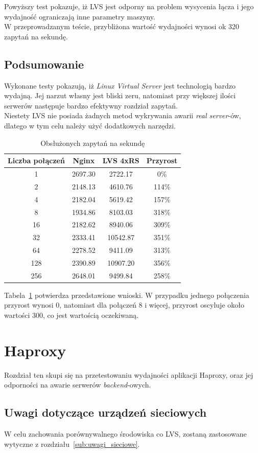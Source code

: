 Powyższy test pokazuje, iż LVS jest odporny na problem wysycenia łącza i jego wydajność ograniczają inne parametry maszyny.\\
W przeprowadzanym teście, przybliżona wartość wydajności wynosi ok 320 zapytań na sekundę.
\subsection{Podsumowanie}
Wykonane testy pokazują, iż \textit{Linux Virtual Server} jest technologią bardzo wydajną.
Jej narzut własny jest bliski zeru, natomiast przy większej ilości serwerów następuje bardzo efektywny rozdział zapytań.\\
Niestety LVS nie posiada żadnych metod wykrywania awarii \textit{real server}-ów, dlatego w tym celu należy użyć dodatkowych narzędzi.
\begin{table}[h]
\centering
\begin{tabular}{cccc}
	\toprule
	Liczba połączeń & Nginx & LVS 4xRS & Przyrost\\
	\midrule
	\midrule
	1&2697.30&2722.17&0\%\\
	\midrule
	2&2148.13&4610.76&114\%\\
	\midrule
	4&2182.04&5619.42&157\%\\
	\midrule
	8&1934.86&8103.03&318\%\\
	\midrule
	16&2182.62&8940.06&309\%\\
	\midrule
	32&2333.41&10542.87&351\%\\
	\midrule
	64&2278.52&9411.09&313\%\\
	\midrule
	128&2390.89&10907.20&356\%\\
	\midrule
	256&2648.01&9499.84&258\%\\
	\bottomrule
\end{tabular}
\caption{Obsłużonych zapytań na sekundę}
\label{tab:test_lvs}
\end{table}
Tabela~\ref{tab:test_lvs} potwierdza przedstawione wnioski.
W przypadku jednego połączenia przyrost wynosi 0, natomiast dla połączeń 8 i więcej, przyrost oscyluje około wartości 300, co jest wartością oczekiwaną.
\section{Haproxy}
Rozdział ten skupi się na przetestowaniu wydajności aplikacji Haproxy, oraz jej odporności na awarie serwerów \textit{backend}-owych.
\subsection{Uwagi dotyczące urządzeń sieciowych}
W celu zachowania porównywalnego środowiska co LVS, zostaną zastosowane wytyczne z rozdziału~\ref{sub:uwagi_sieciowe}.
